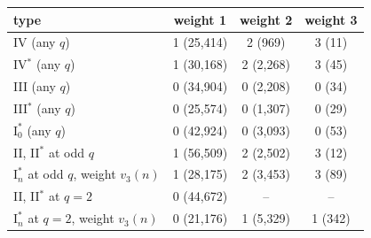 \begin{tabular}{lccc}
\hline
type & weight 1 & weight 2 & weight 3 \\
\hline
IV (any $q$) & 1 (25,414) & 2 (969) & 3 (11) \\
IV$^*$ (any $q$) & 1 (30,168) & 2 (2,268) & 3 (45) \\
III (any $q$) & 0 (34,904) & 0 (2,208) & 0 (34) \\
III$^*$ (any $q$) & 0 (25,574) & 0 (1,307) & 0 (29) \\
$\mathrm{I}_0^*$ (any $q$) & 0 (42,924) & 0 (3,093) & 0 (53) \\
II, II$^*$ at odd $q$ & 1 (56,509) & 2 (2,502) & 3 (12) \\
$\mathrm{I}_n^*$ at odd $q$, weight $v_3(n)$ & 1 (28,175) & 2 (3,453) & 3 (89) \\
II, II$^*$ at $q=2$ & 0 (44,672) & -- & -- \\
$\mathrm{I}_n^*$ at $q=2$, weight $v_3(n)$ & 0 (21,176) & 1 (5,329) & 1 (342) \\
\hline
\end{tabular}
